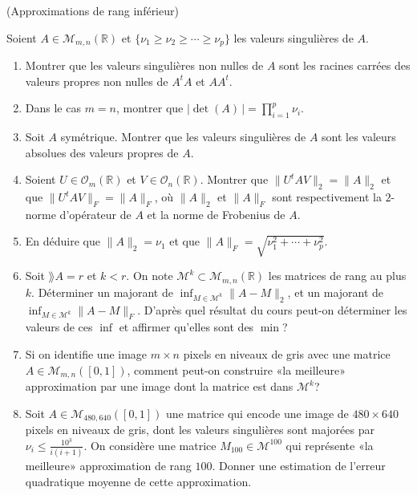 \documentclass[a4paper,12pt,reqno]{amsart}
\begin{document}
\begin{exo} (Approximations de rang inférieur)

Soient $A \in \mathcal{M}_{m,n}(\mathbb{R})$ et $\{ \nu_{1} \geq \nu_{2} \geq \cdots \geq \nu_{p}\}$ les valeurs singulières de $A$.

    \begin{enumerate}

        \item Montrer que les valeurs singulières non nulles de $A$ sont les racines carrées des valeurs propres non nulles de $A^{t}A$ et $AA^{t}$.

        \item Dans le cas $m=n$, montrer que $ |\det(A)\,| = \prod_{i=1}^{p} \nu_{i}$.

        \item Soit $A$ symétrique. Montrer que les valeurs singulières de $A$ sont les valeurs absolues des valeurs propres de $A$.

        \item Soient $U \in \mathcal{O}_{m}(\mathbb{R})$ et $V \in \mathcal{O}_{n}(\mathbb{R})$. Montrer que $\| U^{t} A  V\|_{2} = \| A \|_{2}$ et que $\| U^{t} A  V\|_{F} = \| A \|_{F}$, où $\| A \|_{2}$ et $\| A \|_{F}$ sont respectivement la $2$-norme d'opérateur de $A$ et la norme de Frobenius de $A$.

        \item En déduire que $\| A \|_{2} = \nu_{1}$ et que $\| A \|_{F} = \sqrt{\nu_{1}^{2}+\cdots+\nu_{p}^{2}}$.

        \item Soit $\rang A = r$ et $k < r$. On note $\mathcal{M}^{k} \subset \mathcal{M}_{m,n}(\mathbb{R})$ les matrices de rang au plus $k$.  Déterminer un majorant de $\inf_{M \in \mathcal{M}^{k}}\| A - M\|_{2}$, et un majorant de $\inf_{M \in \mathcal{M}^{k}}\| A - M\|_{F}$. D'après quel résultat du cours peut-on déterminer les valeurs de ces $\inf$ et affirmer qu'elles sont des $\min$?

        \item Si on identifie une image $m \times n$ pixels en niveaux de gris avec une matrice $A \in \mathcal{M}_{m,n}([0,1])$, comment peut-on construire «la meilleure» approximation par une image dont la matrice est dans $\mathcal{M}^{k}$?

        \item Soit $A \in \mathcal{M}_{480,640}([0,1])$ une matrice qui encode une image de $480 \times 640$ pixels en niveaux de gris, dont les valeurs singulières sont majorées par $\nu_{i} \leq \frac{10^{3}}{i(i+1)}$. On considère une matrice $M_{100} \in \mathcal{M}^{100}$ qui représente «la meilleure» approximation de rang $100$. Donner une estimation de l'erreur quadratique moyenne de cette approximation.
    \end{enumerate}
\end{exo}
\end{document}
